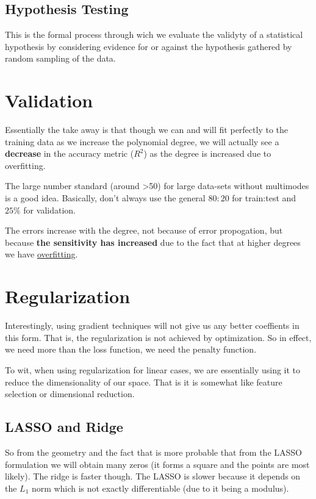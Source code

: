 \documentclass[12pt,a4paper,oneside,headinclude]{scrartcl}
\numberwithin{figure}{section}
\numberwithin{equation}{section}
\numberwithin{table}{section}
\begin{document}
\subsection{Hypothesis Testing}
\label{sec:org14c2072}
This is the formal process through wich we evaluate the validyty of a
statistical hypothesis by considering evidence for or against the hypothesis
gathered by random sampling of the data.

\section{Validation}
\label{sec:org25c31d9}
Essentially the take away is that though we can and will fit perfectly to the
training data as we increase the polynomial degree, we will actually see a
\textbf{decrease} in the accuracy metric (\(R^2\)) as the degree is increased due to
overfitting.

The large number standard (around >50) for large data-sets without multimodes is
a good idea. Basically, don't always use the general \(80:20\) for train:test and
\(25\%\) for validation.

The errors increase with the degree, not because of error propogation, but
because \textbf{the sensitivity has increased} due to the fact that at higher degrees
we have \uline{overfitting}.

\section{Regularization}
\label{sec:org3f462d8}
Interestingly, using gradient techniques will not give us any better coeffients
in this form. That is, the regularization is not achieved by optimization. So in
effect, we need more than the loss function, we need the penalty function.

To wit, when using regularization for linear cases, we are essentially using it
to reduce the dimensionality of our space. That is it is somewhat like feature
selection or dimensional reduction.
\subsection{LASSO and Ridge}
\label{sec:org520b9f5}
So from the geometry and the fact that is more probable that from the LASSO
formulation we will obtain many zeros (it forms a square and the points are most
likely). The ridge is faster though. The LASSO is slower because it depends on
the \(L_1\) norm which is not exactly differentiable (due to it being a modulus).
\end{document}
